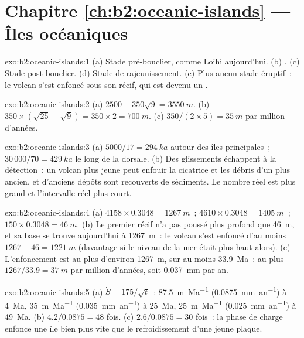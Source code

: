 \section*{Chapitre \ref{ch:b2:oceanic-islands} --- Îles océaniques}

\begin{solution}{exo:b2:oceanic-islands:1}
(a) Stade pré-bouclier, comme Loihi aujourd'hui. (b) . (c) Stade post-bouclier. (d) Stade de
rajeunissement. (e) Plus aucun stade éruptif~: le volcan s'est enfoncé sous son récif, qui est devenu un .
\end{solution}

\begin{solution}{exo:b2:oceanic-islands:2}
(a) $2500 + 350\sqrt9 = \qty{3550}{m}$. (b) $350\times(\sqrt{25} - \sqrt9) = 350\times2 =
\qty{700}{m}$. (c) $350/(2\times5) = \qty{35}{m}$ par million d'années.
\end{solution}

\begin{solution}{exo:b2:oceanic-islands:3}
(a) $5000/17 = \qty{294}{ka}$ autour des îles principales~; $30\,000/70 = \qty{429}{ka}$
le long de la dorsale. (b) Des glissements échappent à la détection~: un volcan plus
jeune peut enfouir la cicatrice et les débris d'un plus ancien, et d'anciens dépôts sont
recouverts de sédiments. Le nombre réel est plus grand et l'intervalle réel plus court.
\end{solution}

\begin{solution}{exo:b2:oceanic-islands:4}
(a) $4158\times0.3048 = \qty{1267}{m}$~; $4610\times0.3048 = \qty{1405}{m}$~; $150\times0.3048 =
\qty{46}{m}$. (b) Le premier récif n'a pas poussé plus profond que \qty{46}{m}, et sa base se trouve aujourd'hui à
\qty{1267}{m}~: le volcan s'est enfoncé d'au moins $1267 - 46 = \qty{1221}{m}$ (davantage si le niveau
de la mer était plus haut alors). (c) L'enfoncement est au plus d'environ \qty{1267}{m}, sur au moins
\qty{33.9}{Ma}~: au plus $1267/33.9 = \qty{37}{m}$ par million d'années, soit \qty{0.037}{mm} par an.
\end{solution}

\begin{solution}{exo:b2:oceanic-islands:5}
(a) $\dot S = 175/\sqrt t$~: \qty{87.5}{m.Ma^{-1}} (\qty{0.0875}{mm.an^{-1}}) à \qty{4}{Ma},
\qty{35}{m.Ma^{-1}} (\qty{0.035}{mm.an^{-1}}) à \qty{25}{Ma}, \qty{25}{m.Ma^{-1}}
(\qty{0.025}{mm.an^{-1}}) à \qty{49}{Ma}. (b) $4.2/0.0875 = 48$ fois. (c) $2.6/0.0875 = 30$
fois~: la phase de charge enfonce une île bien plus vite que le refroidissement d'une jeune plaque.
\end{solution}

